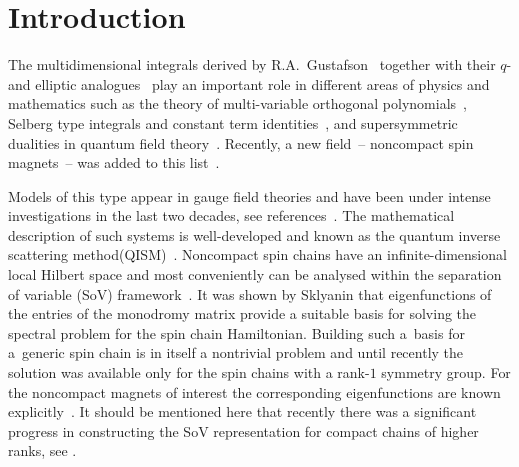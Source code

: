 \documentclass[pdftex]{sigma}
\numberwithin{equation}{section}
\begin{document}

\renewcommand{\thefootnote}{\arabic{footnote}}
\setcounter{footnote}{0}

\section{Introduction}

The multidimensional integrals derived by R.A.~Gustafson~\cite{Gustafson92,Gustafson94} together with their $q$- and
elliptic analogues~\cite{Gustafson92,Gustafson94,Gustafson94-2,Spiridonov,MR2281166,Spiridonov06} play an important
role in different areas of physics and mathematics such as the theory of multi-variable orthogonal
polynomials~\cite{Stockman}, Selberg type integrals and constant term identities~\cite{AAR,Forrester-Warnaar}, and
supersymmetric dualities in quantum field theory~\cite{Spiridonov:2009za}. Recently, a new field~-- noncompact spin
magnets~-- was added to this list~\cite{Derkachov:2016dhc}.

Models of this type appear in gauge field theories and have been under intense investigations in the last two
decades, see references~\cite{Beisert:2010jr,Belitsky:2004cz}. The mathematical description of such systems is
well-developed and known as the quantum inverse scattering method(QISM)~\cite{MR1616371,Kulish:1981gi,Kulish:1981bi,Sklyanin:1988yz,Sklyanin:1991ss, STF}. Noncompact spin chains
have an infinite-dimensional local Hilbert space and most conveniently can be analysed within the separation of
variable (SoV) framework~\cite{Sklyanin:1991ss}. It was shown by Sklyanin that eigenfunctions of the entries of the
monodromy matrix provide a suitable basis for solving the spectral problem for the spin chain Hamiltonian. Building
such a~basis for a~generic spin chain is in itself a nontrivial problem and until recently the solution was available
only for the spin chains with a rank-$1$ symmetry group. For the noncompact magnets of interest the corresponding eigenfunctions are known explicitly~\cite{Belitsky:2014rba,MR1866770, Derkachov:2014gya}. It should be
mentioned here that recently there was a significant progress in constructing the SoV representation for compact
chains of higher ranks, see \cite{Cavaglia:2019pow, MR3868402,Gromov:2016itr,Kitanine:2016pvg,Kitanine:2018gki,Maillet:2018bim,Ryan:2018fyo}.
\end{document}
